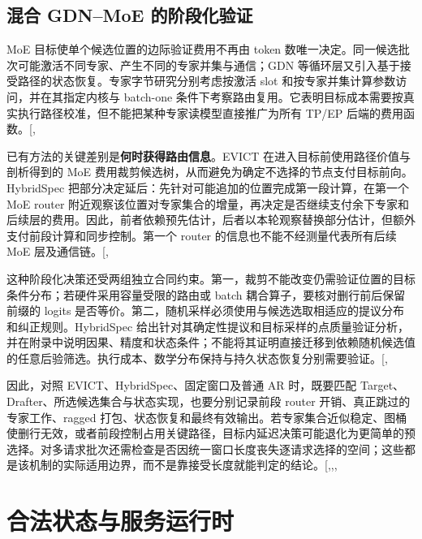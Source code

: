 \documentclass[
  a4paper,
  UTF8,
  fontset=none,
  zihao=5]{ctexart}
\begin{document}
\subsection{混合 GDN--MoE 的阶段化验证}\label{hybrid-budget}

MoE 目标使单个候选位置的边际验证费用不再由 token
数唯一决定。同一候选批次可能激活不同专家、产生不同的专家并集与通信；GDN
等循环层又引入基于接受路径的状态恢复。专家字节研究分别考虑按激活 slot
和按专家并集计算参数访问，并在其指定内核与 batch-one
条件下考察路由复用。它表明目标成本需要按真实执行路径校准，但不能把某种专家读模型直接推广为所有
TP/EP
后端的费用函数。{[},\citeproc{ref-moebytes}{54}{]}

已有方法的关键差别是\textbf{何时获得路由信息}。EVICT
在进入目标前使用路径价值与剖析得到的 MoE
费用裁剪候选树，从而避免为确定不选择的节点支付目标前向。HybridSpec
把部分决定延后：先针对可能追加的位置完成第一段计算，在第一个 MoE router
附近观察该位置对专家集合的增量，再决定是否继续支付余下专家和后续层的费用。因此，前者依赖预先估计，后者以本轮观察替换部分估计，但额外支付前段计算和同步控制。第一个
router 的信息也不能不经测量代表所有后续 MoE
层及通信链。{[},\citeproc{ref-evict}{25}{]}

这种阶段化决策还受两组独立合同约束。第一，裁剪不能改变仍需验证位置的目标条件分布；若硬件采用容量受限的路由或
batch 耦合算子，要核对删行前后保留前缀的 logits
是否等价。第二，随机采样必须使用与候选选取相适应的提议分布和纠正规则。HybridSpec
给出针对其确定性提议和目标采样的点质量验证分析，并在附录中说明因果、精度和状态条件；不能将其证明直接迁移到依赖随机候选值的任意后验筛选。执行成本、数学分布保持与持久状态恢复分别需要验证。{[},\citeproc{ref-hybridspec}{7}{]}

因此，对照 EVICT、HybridSpec、固定窗口及普通 AR 时，既要匹配
Target、Drafter、所选候选集合与状态实现，也要分别记录前段 router
开销、真正跳过的专家工作、ragged
打包、状态恢复和最终有效输出。若专家集合近似稳定、图桶使删行无效，或者前段控制占用关键路径，目标内延迟决策可能退化为更简单的预选择。对多请求批次还需检查是否因统一窗口长度丧失逐请求选择的空间；这些都是该机制的实际适用边界，而不是靠接受长度就能判定的结论。{[},,,\citeproc{ref-moebytes}{54}{]}

\section{合法状态与服务运行时}\label{runtime}
\end{document}
